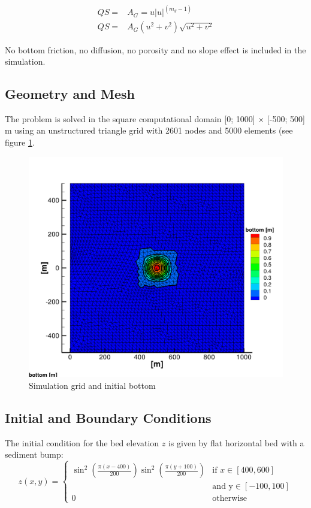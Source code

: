 \begin{equation}
\begin{array}{ll}
     QS = &A_G = u |u|^{(m_g-1)} \\
     QS = & A_G (u^2+v^2)  \sqrt{u^2 + v^2}
\end{array}
\end{equation}


No bottom friction, no diffusion, no porosity and no slope effect is included in the simulation.
%
\subsection{Geometry and Mesh}
%
The problem is solved in the
square computational domain [0; 1000] $\times$ [-500; 500] m using an unstructured triangle grid with 2601 nodes and
5000 elements (see figure \ref{ini}.
\begin{figure} [!h] %
\centering
\includegraphics[width=\textwidth]{../img/sis_bump2d-ini.png}
 \caption{Simulation grid and initial bottom}\label{ini}
\end{figure}

%
\subsection{Initial and Boundary Conditions}
%
The initial condition for the
bed elevation $z$ is given by flat horizontal bed with a sediment bump:
\begin{equation}
z(x,y) = \left\{
  \begin{array}{lr}
\sin^2 (\frac{\pi (x-400)}{200}) \sin^2 (\frac{\pi (y+100)}{200}) & \text{if } x \in [400, 600] \\
& \text{and y} \in [-100,100] \\
0 & \text{otherwise}
  \end{array}
\right.
\end{equation}

